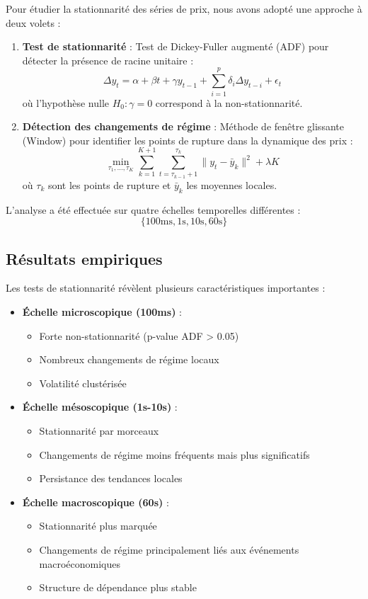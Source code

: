 \documentclass[10pt,a4paper]{article}
\theoremstyle{definition}
\theoremstyle{remark}
\begin{document}
Pour étudier la stationnarité des séries de prix, nous avons adopté une approche à deux volets :

\begin{enumerate}
    \item \textbf{Test de stationnarité} : Test de Dickey-Fuller augmenté (ADF) pour détecter la présence de racine unitaire :
    \[\Delta y_t = \alpha + \beta t + \gamma y_{t-1} + \sum_{i=1}^p \delta_i \Delta y_{t-i} + \epsilon_t\]
    où l'hypothèse nulle $H_0: \gamma = 0$ correspond à la non-stationnarité.
    
    \item \textbf{Détection des changements de régime} : Méthode de fenêtre glissante (Window) pour identifier les points de rupture dans la dynamique des prix :
    \[
    \min_{\tau_1,\ldots,\tau_K} \sum_{k=1}^{K+1} \sum_{t=\tau_{k-1}+1}^{\tau_k} \|y_t - \bar{y}_k\|^2 + \lambda K
    \]
    où $\tau_k$ sont les points de rupture et $\bar{y}_k$ les moyennes locales.
\end{enumerate}

L'analyse a été effectuée sur quatre échelles temporelles différentes :
\[\{\text{100ms}, \text{1s}, \text{10s}, \text{60s}\}\]

\subsection{Résultats empiriques}

Les tests de stationnarité révèlent plusieurs caractéristiques importantes :

\begin{itemize}
    \item \textbf{Échelle microscopique (100ms)} : 
    \begin{itemize}
        \item Forte non-stationnarité (p-value ADF > 0.05)
        \item Nombreux changements de régime locaux
        \item Volatilité clustérisée
    \end{itemize}
    
    \item \textbf{Échelle mésoscopique (1s-10s)} :
    \begin{itemize}
        \item Stationnarité par morceaux
        \item Changements de régime moins fréquents mais plus significatifs
        \item Persistance des tendances locales
    \end{itemize}
    
    \item \textbf{Échelle macroscopique (60s)} :
\begin{itemize}
        \item Stationnarité plus marquée
        \item Changements de régime principalement liés aux événements macroéconomiques
        \item Structure de dépendance plus stable
\end{itemize}
\end{itemize}
\end{document}
